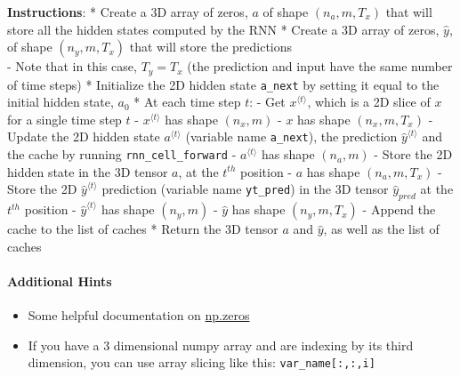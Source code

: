 \documentclass[11pt]{article}
\providecommand{\tightlist}{%
      \setlength{\itemsep}{0pt}\setlength{\parskip}{0pt}}
\begin{document}
\textbf{Instructions}: * Create a 3D array of zeros, \(a\) of shape
\((n_{a}, m, T_{x})\) that will store all the hidden states computed by
the RNN * Create a 3D array of zeros, \(\hat{y}\), of shape
\((n_{y}, m, T_{x})\) that will store the predictions\\
- Note that in this case, \(T_{y} = T_{x}\) (the prediction and input
have the same number of time steps) * Initialize the 2D hidden state
\texttt{a\_next} by setting it equal to the initial hidden state,
\(a_{0}\) * At each time step \(t\): - Get \(x^{\langle t \rangle}\),
which is a 2D slice of \(x\) for a single time step \(t\) -
\(x^{\langle t \rangle}\) has shape \((n_{x}, m)\) - \(x\) has shape
\((n_{x}, m, T_{x})\) - Update the 2D hidden state
\(a^{\langle t \rangle}\) (variable name \texttt{a\_next}), the
prediction \(\hat{y}^{\langle t \rangle}\) and the cache by running
\texttt{rnn\_cell\_forward} - \(a^{\langle t \rangle}\) has shape
\((n_{a}, m)\) - Store the 2D hidden state in the 3D tensor \(a\), at
the \(t^{th}\) position - \(a\) has shape \((n_{a}, m, T_{x})\) - Store
the 2D \(\hat{y}^{\langle t \rangle}\) prediction (variable name
\texttt{yt\_pred}) in the 3D tensor \(\hat{y}_{pred}\) at the \(t^{th}\)
position - \(\hat{y}^{\langle t \rangle}\) has shape \((n_{y}, m)\) -
\(\hat{y}\) has shape \((n_{y}, m, T_x)\) - Append the cache to the list
of caches * Return the 3D tensor \(a\) and \(\hat{y}\), as well as the
list of caches

\hypertarget{additional-hints}{%
\paragraph{Additional Hints}\label{additional-hints}}

\begin{itemize}
\tightlist
\item
  Some helpful documentation on
  \href{https://docs.scipy.org/doc/numpy/reference/generated/numpy.zeros.html}{np.zeros}
\item
  If you have a 3 dimensional numpy array and are indexing by its third
  dimension, you can use array slicing like this:
  \texttt{var\_name{[}:,:,i{]}}
\end{itemize}
\end{document}
